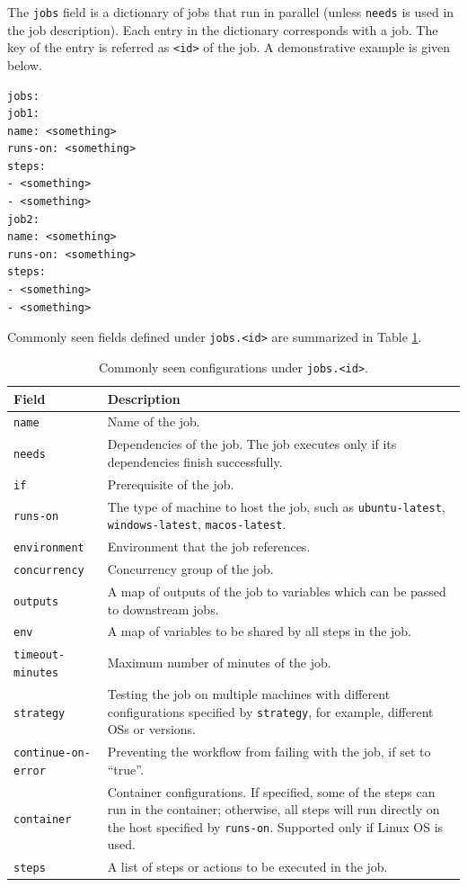 The \verb|jobs| field is a dictionary of jobs that run in parallel (unless \verb|needs| is used in the job description). Each entry in the dictionary corresponds with a job. The key of the entry is referred as \verb|<id>| of the job. A demonstrative example is given below.
\begin{lstlisting}
jobs:
job1:
name: <something>
runs-on: <something>
steps:
- <something>
- <something>
job2:
name: <something>
runs-on: <something>
steps:
- <something>
- <something>
\end{lstlisting}
Commonly seen fields defined under \texttt{jobs.<id>} are summarized in Table \ref{tab:githubactions_jobs}.
\begin{table}[!htb]
	\centering \caption{Commonly seen configurations under \texttt{jobs.<id>}.}\label{tab:githubactions_jobs}
	\begin{tabularx}{\textwidth}{lX}
		\hline
		Field & Description \\ \hline
		\texttt{name} & Name of the job. \\
		\texttt{needs} & Dependencies of the job. The job executes only if its dependencies finish successfully.\\
		\texttt{if} & Prerequisite of the job. \\
		\texttt{runs-on} & The type of machine to host the job, such as \texttt{ubuntu-latest}, \texttt{windows-latest}, \texttt{macos-latest}. \\
		\texttt{environment} & Environment that the job references. \\
		\texttt{concurrency} & Concurrency group of the job. \\
		\texttt{outputs} & A map of outputs of the job to variables which can be passed to downstream jobs. \\
		\texttt{env} & A map of variables to be shared by all steps in the job. \\
		\texttt{timeout-minutes} & Maximum number of minutes of the job. \\
		\texttt{strategy} & Testing the job on multiple machines with different configurations specified by \texttt{strategy}, for example, different OSs or versions. \\
		\texttt{continue-on-error} & Preventing the workflow from failing with the job, if set to ``true''. \\
		\texttt{container} & Container configurations. If specified, some of the steps can run in the container; otherwise, all steps will run directly on the host specified by \texttt{runs-on}. Supported only if Linux OS is used. \\
		\texttt{steps} & A list of steps or actions to be executed in the job. \\
		\hline
	\end{tabularx}
\end{table}

